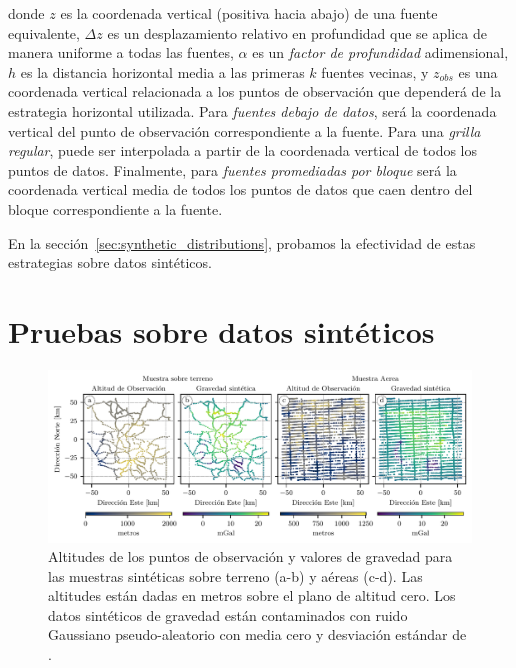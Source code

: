 \noindent
donde $z$ es la coordenada vertical (positiva hacia abajo) de una fuente
equivalente,
$\Delta z$ es un desplazamiento relativo en profundidad que se aplica de manera
uniforme a todas las fuentes,
$\alpha$ es un \emph{factor de profundidad} adimensional,
$h$ es la distancia horizontal media a las primeras $k$ fuentes vecinas,
y
$z_{obs}$ es una coordenada vertical relacionada a los puntos de observación
que dependerá de la estrategia horizontal utilizada.
Para \emph{fuentes debajo de datos}, será la coordenada vertical del
punto de observación correspondiente a la fuente.
Para una \emph{grilla regular}, puede ser interpolada a partir de la coordenada
vertical de todos los puntos de datos.
Finalmente, para \emph{fuentes promediadas por bloque} será la coordenada
vertical media de todos los puntos de datos que caen dentro del bloque
correspondiente a la fuente.

En la sección~\ref{sec:synthetic_distributions}, probamos la efectividad de
estas estrategias sobre datos sintéticos.


\section{Pruebas sobre datos sintéticos}

\begin{figure}[tb]
    \includegraphics[width=\linewidth]{figs/eql-gradient-boosted/synthetic-survey-layouts.pdf}
    \caption{
        Altitudes de los puntos de observación y valores de gravedad para las
        muestras sintéticas sobre terreno (a-b) y aéreas (c-d).
        Las altitudes están dadas en metros sobre el plano de altitud cero.
        Los datos sintéticos de gravedad están contaminados con ruido Gaussiano
        pseudo-aleatorio con media cero y desviación estándar de
        \SurveyNoise{}.
    }
    \label{fig:synthetic-layouts}
\end{figure}

